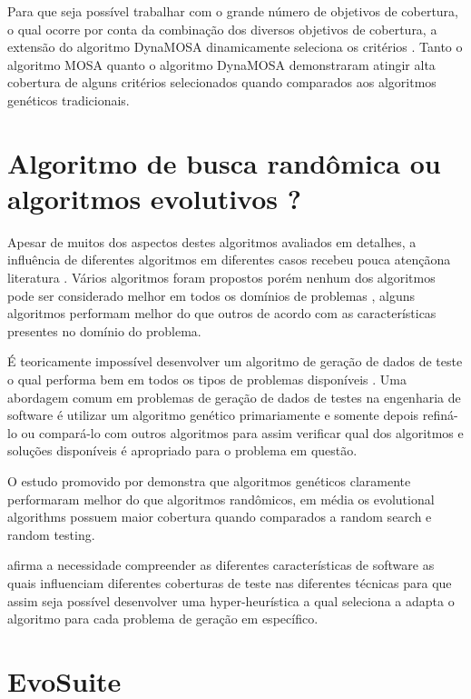 \documentclass[
	12pt,				%
	oneside,			%
	a4paper,			%
	english,			%
	brazil				%
	]{abntex2ppgsi}
\begin{document}
Para que seja possível trabalhar com o grande número de objetivos de cobertura, o qual ocorre por conta da combinação dos diversos objetivos de cobertura, a extensão  do algoritmo DynaMOSA dinamicamente seleciona  os critérios  \cite{Campos2017}. Tanto o algoritmo MOSA quanto o algoritmo DynaMOSA demonstraram atingir alta cobertura de alguns critérios selecionados quando comparados aos algoritmos genéticos tradicionais. \cite{Campos2017}

\section{Algoritmo de busca randômica ou algoritmos evolutivos ?}
Apesar de muitos dos aspectos destes algoritmos avaliados em detalhes, a influência de diferentes algoritmos em diferentes casos recebeu pouca atençãona literatura \cite{Campos2017}. Vários algoritmos foram propostos porém nenhum dos algoritmos pode ser considerado melhor em todos os domínios de problemas , alguns algoritmos performam melhor do que outros de acordo com as características presentes no domínio do problema. \cite{Campos2017}


É teoricamente impossível desenvolver um algoritmo de geração de dados de teste o qual performa bem em todos os tipos de problemas disponíveis \cite{Campos2017}. Uma abordagem comum em problemas de geração de dados de testes na engenharia de software é utilizar um algoritmo genético primariamente e somente depois refiná-lo ou compará-lo com outros algoritmos para assim verificar qual dos algoritmos e soluções disponíveis  é apropriado para o problema em questão. \cite{Campos2017}

O estudo promovido por \cite{Campos2017} demonstra que algoritmos genéticos claramente performaram melhor do que algoritmos randômicos, em média os evolutional algorithms possuem maior cobertura quando comparados a random search e random testing. \cite{Campos2017}

\cite{Campos2017} afirma a necessidade compreender as diferentes características de software as quais influenciam diferentes coberturas de teste nas diferentes técnicas para que assim seja possível desenvolver uma hyper-heurística a qual seleciona a adapta o algoritmo para cada problema de geração em específico.

\section{EvoSuite}
\end{document}
